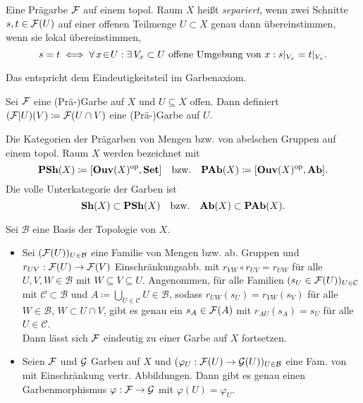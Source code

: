 \documentclass{cheat-sheet}
\begin{document}
\begin{defn}
  Eine Prägarbe $\mathcal{F}$ auf einem topol. Raum $X$ heißt \emph{separiert}, wenn zwei Schnitte $s, t \in \mathcal{F}(U)$ auf einer offenen Teilmenge $U \subset X$ genau dann übereinstimmen, wenn sie lokal übereinstimmen, \dh{}
  \[ s = t \iff \forall \, {x \!\in\! U\!} \,:\,\! \exists \, {V_x \subset U \text{ offene Umgebung von $x$}\!} \,:\,\! s|_{V_x} = t|_{V_x}. \]
\end{defn}

\begin{bem}
  Das entspricht dem Eindeutigkeitsteil im Garbenaxiom.
\end{bem}

\begin{bem}
  Sei $\mathcal{F}$ eine (Prä-)Garbe auf $X$ und $U \subseteq X$ offen. Dann definiert $(\mathcal{F}|U)(V) \coloneqq \mathcal{F}(U \cap V)$ eine (Prä-)Garbe auf $U$.
\end{bem}

\begin{nota}
  Die Kategorien der Prägarben von Mengen bzw. von abelschen Gruppen auf einem topol. Raum $X$ werden bezeichnet mit
  \[
    \mathbf{PSh}(X) \coloneqq [\mathbf{Ouv}(X)^{\mathrm{op}}, \mathbf{Set}]
    \quad \text{bzw.} \quad
    \mathbf{PAb}(X) \coloneqq [\mathbf{Ouv}(X)^{\mathrm{op}}, \mathbf{Ab}].
  \]
  Die volle Unterkategorie der Garben ist
  \[
    \mathbf{Sh}(X) \subset \mathbf{PSh}(X)
    \quad \text{bzw.} \quad
    \mathbf{Ab}(X) \subset \mathbf{PAb}(X).
  \]
\end{nota}

\begin{lem}
  Sei $\mathcal{B}$ eine Basis der Topologie von $X$.
  \begin{itemize}
    \item Sei $(\mathcal{F}(U))_{U \in \mathcal{B}}$ eine Familie von Mengen bzw. ab. Gruppen und $r_{UV} : \mathcal{F}(U) \to \mathcal{F}(V)$ Einschränkungsabb. mit $r_{VW} \circ r_{UV} = r_{UW}$ für alle $U, V, W \in \mathcal{B}$ mit $W \subseteq V \subseteq U$.
    Angenommen, für alle Familien $(s_U \in \mathcal{F}(U))_{U \in \mathcal{C}}$ mit $\mathcal{C} \subset \mathcal{B}$ und $A \coloneqq {\bigcup}_{U \in \mathcal{C}} U \in \mathcal{B}$, sodass $r_{UW}(s_U) = r_{VW}(s_V)$ für alle $W \in \mathcal{B}$, $W \subset U \cap V$, gibt es genau ein $s_A \in \mathcal{F}(A)$ mit $r_{AU}(s_A) = s_U$ für alle $U \in \mathcal{C}$. \\
    Dann lässt sich $\mathcal{F}$ eindeutig zu einer Garbe auf $X$ fortsetzen.
    \item Seien $\mathcal{F}$ und $\mathcal{G}$ Garben auf $X$ und $(\varphi_U : \mathcal{F}(U) \to \mathcal{G}(U))_{U \in \mathcal{B}}$ eine Fam. von mit Einschränkung vertr. Abbildungen. Dann gibt es genau einen Garbenmorphismus $\varphi : \mathcal{F} \to \mathcal{G}$ mit $\varphi(U) = \varphi_U$.
  \end{itemize}
\end{lem}
\end{document}
